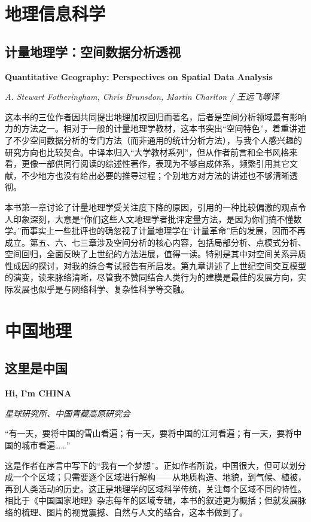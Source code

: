 
\section{地理信息科学}

\subsection*{计量地理学：空间数据分析透视}
\par \textbf{Quantitative Geography: Perspectives on Spatial Data Analysis}
\par \emph{A. Stewart Fotheringham, Chris Brunsdon, Martin Charlton / 王远飞等译} 

\par 这本书的三位作者因共同提出地理加权回归而著名，后者是空间分析领域最有影响力的方法之一。相对于一般的计量地理学教材，这本书突出“空间特色”，着重讲述了不少空间数据分析的专门方法（而非通用的统计分析方法），与我个人感兴趣的研究方向也比较契合。中译本归入“大学教材系列”，但从作者前言和全书风格来看，更像一部供同行阅读的综述性著作，表现为不够自成体系，频繁引用其它文献，不少地方也没有给出必要的推导过程；个别地方对方法的讲述也不够清晰透彻。
\par 本书第一章讨论了计量地理学受关注度下降的原因，引用的一种比较偏激的观点令人印象深刻，大意是“你们这些人文地理学者批评定量方法，是因为你们搞不懂数学。”而事实上一些批评也的确忽视了计量地理学在“计量革命”后的发展，因而不再成立。第五、六、七三章涉及空间分析的核心内容，包括局部分析、点模式分析、空间回归，全面反映了上世纪的方法进展，值得一读。特别是其中对空间关系异质性成因的探讨，对我的综合考试报告有所启发。第九章讲述了上世纪空间交互模型的演变，读来脉络清晰，尽管我不赞同结合人类行为的建模是最佳的发展方向，实际发展也似乎是与网络科学、复杂性科学等交融。
\par {}

\section{中国地理}

\subsection*{这里是中国}
\par \textbf{Hi, I’m CHINA}
\par \emph{星球研究所、中国青藏高原研究会} 

\par “有一天，要将中国的雪山看遍；有一天，要将中国的江河看遍；有一天，要将中国的城市看遍……”
\par 这是作者在序言中写下的“我有一个梦想”。正如作者所说，中国很大，但可以划分成一个个区域；只需要逐个区域进行解构——从地质构造、地貌，到气候、植被，再到人类活动的历史。这正是地理学的区域科学传统，关注每个区域不同的特性。相比于《中国国家地理》杂志每年的区域专辑，本书的叙述更为概括；但就发展脉络的梳理、图片的视觉震撼、自然与人文的结合，这本书做到了。

